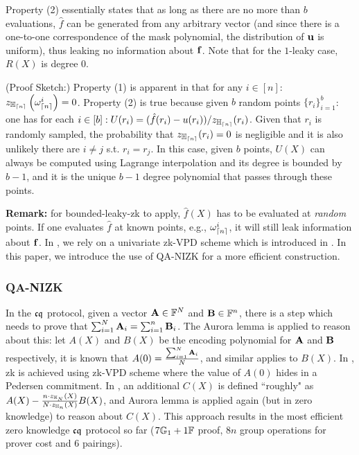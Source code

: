 Property (2) essentially states that as long as there are no more than
$b$ evaluations, $\hat{f}$ can be generated from any arbitrary
vector (and since there is a one-to-one correspondence of the mask polynomial,
the distribution of ${{\mathbf {u}}}$ is uniform), 
thus leaking no information about ${{\mathbf {f}}}$.
Note that for the $1$-leaky case, $R(X)$ is degree $0$.

(Proof Sketch:) Property (1) is apparent in that
for any $i\in [n]$: $z_{{\mathbb{H}_{{\lceil{n}\rceil}}}}\left(\omega_{{\lceil{n}\rceil}}^i\right) = 0$. Property (2)
is true because given $b$ random points $\{r_i\}_{i=1}^b$:
one has for each $i\in [b]: U(r_i) = (\hat{f}(r_i) - u(r_i))/z_{{\mathbb{H}_{{\lceil{n}\rceil}}}}(r_i)$.
Given that $r_i$ is randomly sampled, the probability that
$z_{{\mathbb{H}_{{\lceil{n}\rceil}}}}(r_i)=0$ is negligible and it is also unlikely there
are $i\neq j$ s.t. $r_i = r_j$. In this case, given
$b$ points, $U(X)$ can always be computed using Lagrange interpolation
and its degree is bounded by $b-1$, and it is the unique $b-1$ degree 
polynomial that passes through these points.

{\bf Remark:} for bounded-leaky-zk to apply, $\hat{f}(X)$ has to
be evaluated at {\em random} points. If one evaluates $\hat{f}$
at known points, e.g., $\omega_{{\lceil{n}\rceil}}^i$, it will still leak information
about ${{\mathbf {f}}}$. In \cite{FullIZPR}, we rely on a univariate 
zk-VPD scheme which is introduced in \cite{zkvsql}.
In this paper, we introduce the use of QA-NIZK for a more efficient
construction.

\subsubsection{QA-NIZK \cite{KW15,LegoSnarkFull}}
In the ${\mathfrak{cq}}$ protocol, given a vector ${{\mathbf {A}}} \in \mathbb{F}^N$ and
${{\mathbf {B}}} \in \mathbb{F}^n$, there is a step which needs to prove
that $\sum_{i=1}^N {{\mathbf {A}}}_i = \sum_{i=1}^n {{\mathbf {B}}}_i$.
The Aurora lemma \cite{aurora19} is applied to reason about
this: let $A(X)$ and $B(X)$ be the encoding polynomial
for ${{\mathbf {A}}}$ and ${{\mathbf {B}}}$ respectively,
it is known that $A(0) = \frac{\sum_{i=1}^N {{\mathbf {A}}}_i}{N}$, and similar
applies to $B(X)$. 
In \cite{FullIZPR}, zk is achieved using
zk-VPD scheme \cite{zkvsql} where the value of $A(0)$ hides
in a Pedersen commitment. In \cite{MatrixLookup},
an additional $C(X)$ is defined ``roughly" as
$A(X) - \frac{n\cdot z_{\mathbb{H}_{N}}(X)}{N\cdot z_{\mathbb{H}_{n}}(X)}B(X)$, and Aurora lemma is applied again (but in zero
knowledge) to reason about $C(X)$. This approach results in the most
efficient zero knowledge ${\mathfrak{cq}}$ protocol so far ($7{\mathbb{G}}_1 + 1\mathbb{F}$ proof,
$8n$ group operations for prover cost and $6$ pairings).

